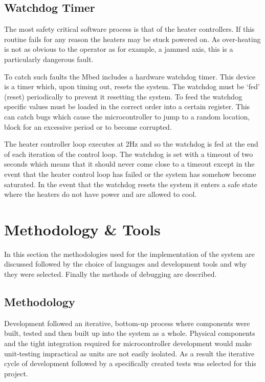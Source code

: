 		\subsection{Watchdog Timer}
			
			The most safety critical software process is that of the heater
			controllers. If this routine fails for any reason the heaters may be stuck
			powered on. As over-heating is not as obvious to the operator as for
			example, a jammed axis, this is a particularly dangerous fault.
			
			To catch such faults the Mbed includes a hardware watchdog timer. This
			device is a timer which, upon timing out, resets the system. The watchdog
			must be `fed' (reset) periodically to prevent it resetting the system. To
			feed the watchdog specific values must be loaded in the correct order into
			a certain register. This can catch bugs which cause the microcontroller to
			jump to a random location, block for an excessive period or to become
			corrupted.
			
			The heater controller loop executes at 2Hz and so the watchdog is fed at
			the end of each iteration of the control loop. The watchdog is set with a
			timeout of two seconds which means that it should never come close to a
			timeout except in the event that the heater control loop has failed or the
			system has somehow become saturated. In the event that the watchdog resets
			the system it enters a safe state where the heaters do not have power and
			are allowed to cool.
	
	\section{Methodology \& Tools}
		
		In this section the methodologies used for the implementation of the system
		are discussed followed by the choice of languages and development tools and
		why they were selected. Finally the methods of debugging are described.
		
		\subsection{Methodology}
		
			Development followed an iterative, bottom-up process where components were
			built, tested and then built up into the system as a whole. Physical
			components and the tight integration required for microcontroller
			development would make unit-testing impractical as units are not easily
			isolated. As a result the iterative cycle of development followed by a
			specifically created tests was selected for this project.
			
